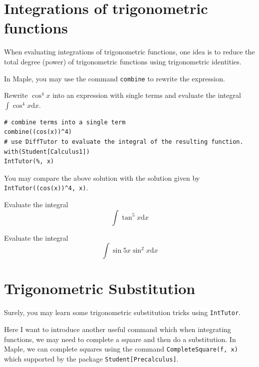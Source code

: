 \documentclass[]{book}
\theoremstyle{definition}
\theoremstyle{definition}
\theoremstyle{definition}
\theoremstyle{remark}
\let\BeginKnitrBlock\begin \let\EndKnitrBlock\end
\begin{document}
\hypertarget{integrations-of-trigonometric-functions}{%
\section{Integrations of trigonometric functions}\label{integrations-of-trigonometric-functions}}

When evaluating integrations of trigonometric functions, one idea is to reduce the total degree (power) of trigonometric functions using trigonometric identities.

In Maple, you may use the command \texttt{combine} to rewrite the expression.

\BeginKnitrBlock{example}
\protect\hypertarget{exm:unnamed-chunk-1}{}{\label{exm:unnamed-chunk-1} }
Rewrite \(\cos^4x\) into an expression with single terms and evaluate the integral \(\int \cos^4x\mathrm{d} x\).
\EndKnitrBlock{example}

\BeginKnitrBlock{solution}
{}

\begin{verbatim}
# combine terms into a single term
combine((cos(x))^4)
# use DiffTutor to evaluate the integral of the resulting function.
with(Student[Calculus1])
IntTutor(%, x)
\end{verbatim}
\EndKnitrBlock{solution}

You may compare the above solution with the solution given by \texttt{IntTutor((cos(x))\^{}4,\ x)}.

\BeginKnitrBlock{exercise}
\protect\hypertarget{exr:unnamed-chunk-3}{}{\label{exr:unnamed-chunk-3} }
Evaluate the integral
\[
\int \tan ^{5} x \mathrm{d} x
\]
\EndKnitrBlock{exercise}

\BeginKnitrBlock{exercise}
\protect\hypertarget{exr:unnamed-chunk-4}{}{\label{exr:unnamed-chunk-4} }
Evaluate the integral
\[
\int \sin 5 x \sin^2 x \mathrm{d} x
\]
\EndKnitrBlock{exercise}

\hypertarget{trigonometric-substitution}{%
\section{Trigonometric Substitution}\label{trigonometric-substitution}}

Surely, you may learn some trigonometric substitution tricks using \texttt{IntTutor}.

Here I want to introduce another useful command which when integrating functions, we may need to complete a square and then do a substitution. In Maple, we can complete squares using the command \texttt{CompleteSquare(f,\ x)} which supported by the package \texttt{Student{[}Precalculus{]}}.
\end{document}
